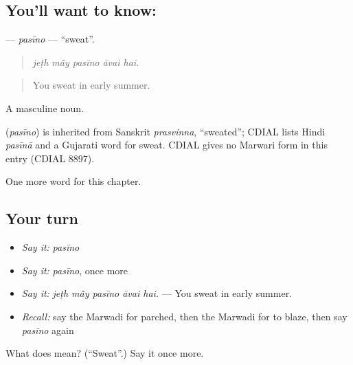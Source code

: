\subsection*{You'll want to know: }
\textbf{} — \emph{pasīno} — \textquotedblleft{}sweat\textquotedblright{}.

\begin{quote}
    
\end{quote}

\begin{quote}
\emph{jeṭh mā̃y pasīno āvai hai.}
\end{quote}

\begin{quote}
You sweat in early summer.
\end{quote}

A masculine noun.

\begin{cousinweb}
\textbf{} (\emph{pasīno}) is inherited from Sanskrit \emph{prasvinna}, \textquotedblleft{}sweated\textquotedblright{}; CDIAL lists Hindi \emph{pasīnā} and a Gujarati word for sweat. CDIAL gives no Marwari form in this entry (CDIAL 8897).
\end{cousinweb}

\begin{grammarlens}[title={What you've built}]
One more word for this chapter.
\end{grammarlens}

\subsection*{Your turn}
\begin{itemize}
\raggedright
  \item \emph{Say it:} \emph{pasīno}
  \item \emph{Say it:} \emph{pasīno}, once more
  \item \emph{Say it:} \emph{jeṭh mā̃y pasīno āvai hai.} — You sweat in early summer.
  \item \emph{Recall:} say the Marwadi for parched, then the Marwadi for to blaze, then say \emph{pasīno} again
\end{itemize}

\begin{tcolorbox}[breakable,colback=teal!4,colframe=teal!35!black,title={Before you move on}]
What does  mean? (\textquotedblleft{}Sweat\textquotedblright{}.) Say it once more.
\end{tcolorbox}

